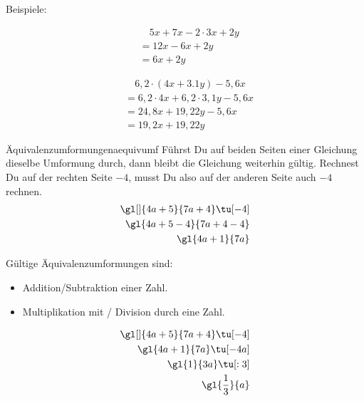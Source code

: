 \documentclass[12pt,a5paper,landscape]{scrartcl}
\begin{document}
\begin{loesungskarte}[Termumformungen]
	Beispiele:
	\begin{multicols}{2}
	\begin{align*}
		&\quad 5x + 7x - 2\cdot 3x + 2y \\
			&= 12x - 6x + 2y \\
			&= 6x + 2y
	\end{align*}

	\begin{align*}
		&\quad 6,2 \cdot (4x + 3.1y) - 5,6x \\
			&= 6,2\cdot 4x + 6,2\cdot 3,1y - 5,6x \\
			&= 24,8x + 19,22y - 5,6x \\
			&= 19,2x + 19,22y
			\end{align*}
	\end{multicols}
\end{loesungskarte}

\begin{hilfekarte}{Äquivalenzumformungen}{aequivumf}
	Führst Du auf beiden Seiten einer Gleichung dieselbe Umformung durch, dann bleibt die Gleichung weiterhin gültig.
	Rechnest Du auf der rechten Seite $-4$, musst Du also auf der anderen Seite auch $-4$ rechnen.
	\begin{alignat*}{3}
	\gl[]{4a + 5}{7a + 4} \tu[-4]\\
	\gl{4a + 5 - 4}{7a + 4 - 4} \\
	\gl{4a + 1}{7a}
	\end{alignat*}
	
	Gültige Äquivalenzumformungen sind:
	\begin{itemize}
		\item Addition/Subtraktion einer Zahl.
		\item Multiplikation mit / Division durch eine Zahl.
	\end{itemize}
\end{hilfekarte}

\begin{loesungskarte}[Äquivalenzumformungen]
	\begin{alignat*}{3}
		\gl[]{4a + 5}{7a + 4} \tu[-4]\\
		\gl{4a + 1}{7a} \tu[-4a] \\
		\gl{1}{3a} \tu[:3] \\
		\gl{\dfrac{1}{3}}{a}
	\end{alignat*}
\end{loesungskarte}
\end{document}
